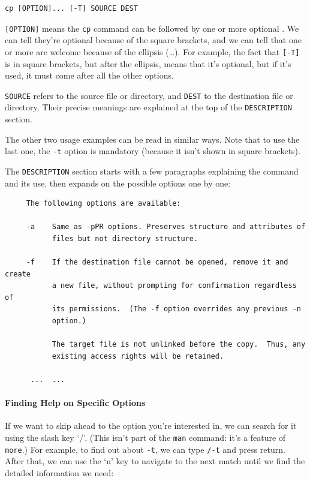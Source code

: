 \documentclass{book}
\begin{document}
\begin{verbatim}
cp [OPTION]... [-T] SOURCE DEST
\end{verbatim}

\texttt{{[}OPTION{]}} means the \texttt{cp} command can be followed by
one or more optional . We can tell
they're optional because of the square brackets, and we can tell that
one or more are welcome because of the ellipsis (\ldots{}). For example,
the fact that \texttt{{[}-T{]}} is in square brackets, but after the
ellipsis, means that it's optional, but if it's used, it must come after
all the other options.

\texttt{SOURCE} refers to the source file or directory, and
\texttt{DEST} to the destination file or directory. Their precise
meanings are explained at the top of the \texttt{DESCRIPTION} section.

The other two usage examples can be read in similar ways. Note that to
use the last one, the \texttt{-t} option is mandatory (because it isn't
shown in square brackets).

The \texttt{DESCRIPTION} section starts with a few paragraphs explaining
the command and its use, then expands on the possible options one by
one:

\begin{verbatim}
     The following options are available:

     -a    Same as -pPR options. Preserves structure and attributes of
           files but not directory structure.

     -f    If the destination file cannot be opened, remove it and create
           a new file, without prompting for confirmation regardless of
           its permissions.  (The -f option overrides any previous -n
           option.)

           The target file is not unlinked before the copy.  Thus, any
           existing access rights will be retained.

      ...  ...
\end{verbatim}

\mbox{}\paragraph{Finding Help on Specific Options}

If we want to skip ahead to the option you're interested in, we can
search for it using the slash key `/'. (This isn't part of the
\texttt{man} command: it's a feature of \texttt{more}.) For example, to
find out about \texttt{-t}, we can type \texttt{/-t} and press return.
After that, we can use the `n' key to navigate to the next match until
we find the detailed information we need:
\end{document}
